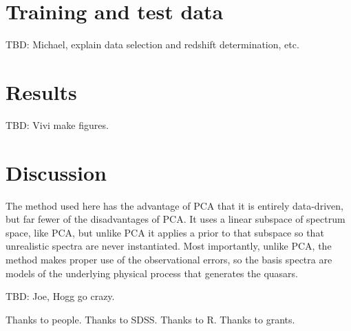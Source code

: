 \documentclass[preprint]{aastex}
\begin{document}
\section{Training and test data}

TBD:  Michael, explain data selection and redshift determination, etc.

\section{Results}

TBD:  Vivi make figures.

\section{Discussion}

The method used here has the advantage of PCA that it is entirely
data-driven, but far fewer of the disadvantages of PCA.  It uses a
linear subspace of spectrum space, like PCA, but unlike PCA it applies
a prior to that subspace so that unrealistic spectra are never
instantiated.  Most importantly, unlike PCA, the method makes proper
use of the observational errors, so the basis spectra are models of
the underlying physical process that generates the quasars.

TBD:  Joe, Hogg go crazy.

\acknowledgements
Thanks to people.  Thanks to SDSS.  Thanks to R.  Thanks to grants.
\end{document}
